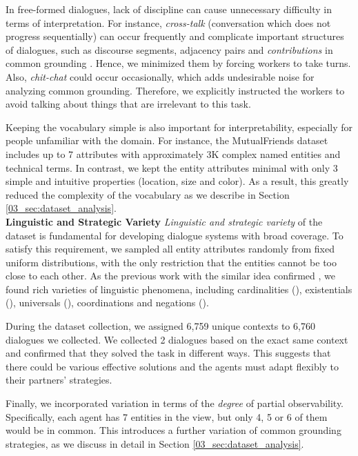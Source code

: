 In free-formed dialogues, lack of discipline can cause unnecessary difficulty in terms of interpretation. For instance, \emph{cross-talk} (conversation which does not progress sequentially) can occur frequently \citep{he2017learning} and complicate important structures of dialogues, such as discourse segments, adjacency pairs and \emph{contributions} in common grounding \citep{clark1989contributing}. Hence, we minimized them by forcing workers to take turns. Also, \emph{chit-chat} could occur occasionally, which adds undesirable noise for analyzing common grounding. Therefore, we explicitly instructed the workers to avoid talking about things that are irrelevant to this task.

Keeping the vocabulary simple is also important for interpretability, especially for people unfamiliar with the domain. For instance, the MutualFriends dataset includes up to 7 attributes with approximately 3K complex named entities and technical terms. In contrast, we kept the entity attributes minimal with only 3 simple and intuitive properties (location, size and color). As a result, this greatly reduced the complexity of the vocabulary as we describe in Section \ref{03_sec:dataset_analysis}.
\\

\noindent
\textbf{Linguistic and Strategic Variety}\quad
\emph{Linguistic and strategic variety} of the dataset is fundamental for developing dialogue systems with broad coverage. To satisfy this requirement, we sampled all entity attributes randomly from fixed uniform distributions, with the only restriction that the entities cannot be too close to each other. As the previous work with the similar idea confirmed \citep{suhr2017corpus}, we found rich varieties of linguistic phenomena, including cardinalities (), existentials (), universals (), coordinations and negations ().

During the dataset collection, we assigned 6,759 unique contexts to 6,760 dialogues we collected. We collected 2 dialogues based on the exact same context and confirmed that they solved the task in different ways. This suggests that there could be various effective solutions and the agents must adapt flexibly to their partners' strategies.

Finally, we incorporated variation in terms of the \textit{degree} of partial observability. Specifically, each agent has 7 entities in the view, but only 4, 5 or 6 of them would be in common. This introduces a further variation of common grounding strategies, as we discuss in detail in Section \ref{03_sec:dataset_analysis}.
\\

